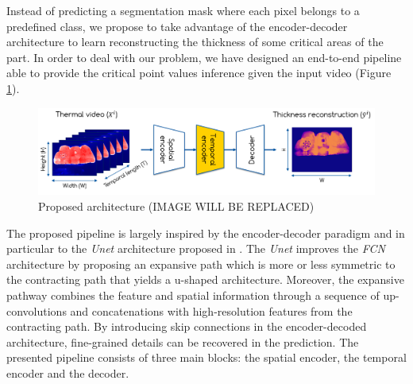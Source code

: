Instead of predicting a segmentation mask where each pixel belongs to a predefined class, we propose to take advantage of the encoder-decoder architecture to learn reconstructing the thickness of some critical areas of the part. In order to deal with our problem, we have designed an end-to-end pipeline able to provide the critical point values inference given the input video (Figure \ref{fig:proposed_architecture}). 
\begin{figure}
\centering
\includegraphics[scale=0.45]{images/chapter_4/proposed_architecture.png}
\caption{Proposed architecture (IMAGE WILL BE REPLACED)}
\label{fig:proposed_architecture}
\end{figure}
The proposed pipeline is largely inspired by the encoder-decoder paradigm and in particular to the \textit{Unet} architecture proposed in \citet{ronneberger2015u}. The \textit{Unet} improves the \textit{FCN} architecture by proposing an expansive path which is more or less symmetric to the contracting path that yields a u-shaped architecture. Moreover, the expansive pathway combines the feature and spatial information through a sequence of up-convolutions and concatenations with high-resolution features from the contracting path. By introducing skip connections in the encoder-decoded architecture, fine-grained details can be recovered in the prediction. 
The presented pipeline consists of three main blocks: the spatial encoder, the temporal encoder and the decoder. 

